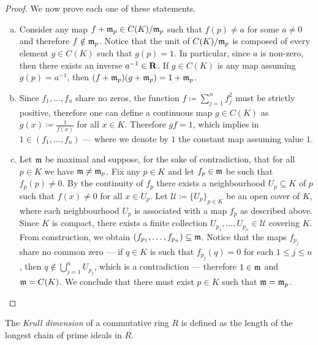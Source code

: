 \begin{proof}
    We now prove each one of these statements.
    \begin{enumerate}[(a)]\setlength\itemsep{0em}
        \item Consider any map \(f + \mathfrak{m}_p \in C(K)/\mathfrak{m}_p\) such that
              \(f(p) \neq a\) for some \(a \neq 0\) and therefore \(f \notin
              \mathfrak{m}_p\). Notice that the unit of \(C(K)/\mathfrak{m}_p\) is composed of
              every element \(g \in C(K)\) such that \(g(p) = 1\). In particular, since
              \(a\) is non-zero, then there exists an inverse \(a^{-1} \in \mathbf{R}\). If
              \(g \in C(K)\) is any map assuming \(g(p) = a^{-1}\), then
              \((f + \mathfrak{m}_p) (g + \mathfrak{m}_p) = 1 + \mathfrak{m}_p\).

        \item Since \(f_1, \dots, f_n\) share no zeros, the function
              \(f \coloneq \sum_{j=1}^n f_j^2\) must be strictly positive, therefore one can
              define a continuous map \(g \in C(K)\) as \(g(x) \coloneq \frac{1}{f(x)}\) for
              all \(x \in K\). Therefore \(g f = 1\), which implies in
              \(1 \in (f_1, \dots, f_n)\) --- where we denote by \(1\) the constant map
              assuming value \(1\).

        \item Let \(\mathfrak{m}\) be maximal and suppose, for the sake of contradiction,
              that for all \(p \in K\) we have \(\mathfrak{m} \neq \mathfrak{m}_p\). Fix any
              \(p \in K\) and let \(f_p \in \mathfrak{m}\) be such that \(f_p(p) \neq 0\). By
              the continuity of \(f_p\) there exists a neighbourhood \(U_p \subseteq K\) of
              \(p\) such that \(f(x) \neq 0\) for all \(x \in U_p\). Let
              \(\mathcal{U} \coloneq \{ U_{p}\}_{p \in K}\) be an open cover of \(K\), where
              each neighbourhood \(U_p\) is associated with a map \(f_p\) as described
              above. Since \(K\) is compact, there exists a finite collection
              \(U_{p_1}, \dots, U_{p_n} \in \mathcal{U}\) covering \(K\). From construction,
              we obtain \((f_{p_1}, \dots, f_{p_n}) \subseteq \mathfrak{m}\). Notice that the
              maps \(f_{p_j}\) share no common zero --- if \(q \in K\) is such that
              \(f_{p_j}(q) = 0\) for each \(1 \leq j \leq n\), then
              \(q \notin \bigcup_{j=1}^n U_{p_j}\), which is a contradiction --- therefore
              \(1 \in \mathfrak{m}\) and \(\mathfrak{m} = C(K)\). We conclude that there must
              exist \(p \in K\) such that \(\mathfrak{m} = \mathfrak{m}_p\).
    \end{enumerate}
\end{proof}

\begin{definition}
    \label{def:krull-dimension}
    The \emph{Krull dimension} of a commutative ring \(R\) is defined as the length
    of the longest chain of prime ideals in \(R\).
\end{definition}


